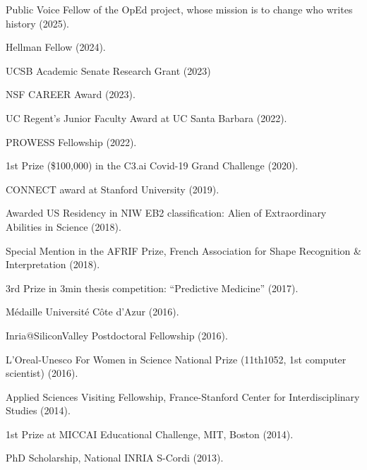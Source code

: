 Public Voice Fellow of the OpEd project, whose mission is to change who writes history (2025).

Hellman Fellow (2024).

UCSB Academic Senate Research Grant (2023)

NSF CAREER Award (2023).

UC Regent’s Junior Faculty Award at UC Santa Barbara (2022).

PROWESS Fellowship (2022).

1st Prize (\$100,000) in the C3.ai Covid-19 Grand Challenge (2020).

CONNECT award at Stanford University (2019).

Awarded US Residency in NIW EB2 classification: Alien of Extraordinary Abilities in Science (2018).

Special Mention in the AFRIF Prize, French Association for Shape Recognition & Interpretation (2018).

3rd Prize in 3min thesis competition: “Predictive Medicine” (2017).

Médaille Université Côte d’Azur (2016).

Inria@SiliconValley Postdoctoral Fellowship (2016).

L'Oreal-Unesco For Women in Science National Prize (11th1052, 1st computer scientist) (2016).

Applied Sciences Visiting Fellowship, France-Stanford Center for Interdisciplinary Studies (2014).

1st Prize at MICCAI Educational Challenge, MIT, Boston (2014).

PhD Scholarship, National INRIA S-Cordi (2013).